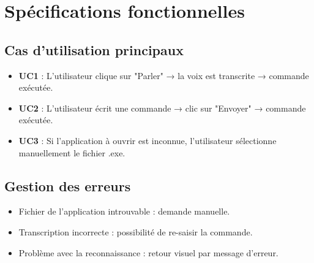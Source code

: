 \documentclass[12pt]{article}
\begin{document}
	\section{Spécifications fonctionnelles}
	\subsection{Cas d'utilisation principaux}
	\begin{itemize}
		\item \textbf{UC1} : L'utilisateur clique sur "Parler" → la voix est transcrite → commande exécutée.
		\item \textbf{UC2} : L'utilisateur écrit une commande → clic sur "Envoyer" → commande exécutée.
		\item \textbf{UC3} : Si l'application à ouvrir est inconnue, l'utilisateur sélectionne manuellement le fichier .exe.
	\end{itemize}
	
	\subsection{Gestion des erreurs}
	\begin{itemize}
		\item Fichier de l'application introuvable : demande manuelle.
		\item Transcription incorrecte : possibilité de re-saisir la commande.
		\item Problème avec la reconnaissance : retour visuel par message d'erreur.
	\end{itemize}
	
\end{document}
